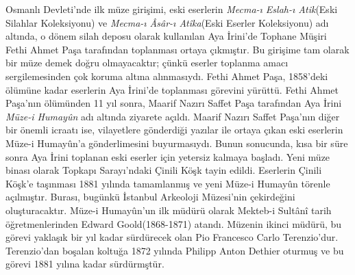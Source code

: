 \indent Osmanlı Devleti'nde ilk müze girişimi, eski eserlerin \textit{Mecma-ı Eslah-ı Atik}(Eski Silahlar Koleksiyonu) ve \textit{Mecma-ı Âsâr-ı Atîka}(Eski Eserler Koleksiyonu) adı altında, o dönem silah deposu olarak kullanılan  Aya İrini'de  Tophane Müşiri Fethi Ahmet Paşa tarafından toplanması ortaya çıkmıştır.\cite{degirmenci} Bu girişime tam olarak bir müze demek doğru olmayacaktır; çünkü eserler toplanma amacı sergilemesinden çok koruma altına alınmasıydı. Fethi Ahmet Paşa, 1858'deki ölümüne kadar eserlerin Aya İrini'de toplanması görevini yürüttü. Fethi Ahmet Paşa'nın ölümünden 11 yıl sonra, Maarif Nazırı Saffet Paşa tarafından Aya İrini \textit{Müze-i Humay\^{u}n} adı altında ziyarete açıldı. Maarif Nazırı Saffet Paşa'nın diğer bir önemli icraatı ise, vilayetlere gönderdiği yazılar ile ortaya çıkan eski eserlerin Müze-i Humay\^{u}n'a gönderlimesini buyurmasıydı. Bunun sonucunda, kısa bir süre sonra Aya İrini toplanan eski eserler için yetersiz kalmaya başladı. Yeni müze binası olarak Topkapı Sarayı'ndaki Çinili Köşk tayin edildi. Eserlerin Çinili Köşk'e taşınması 1881 yılında tamamlanmış ve yeni Müze-i Humay\^{u}n törenle açılmıştır. Burası, bugünkü İstanbul Arkeoloji Müzesi'nin çekirdeğini oluşturacaktır.
\indent Müze-i Humayûn'un ilk müdürü olarak Mekteb-i Sultânî tarih öğretmenlerinden  Edward Goold(1868-1871) atandı. Müzenin ikinci müdürü, bu görevi yaklaşık bir yıl kadar sürdürecek olan Pio Francesco Carlo Terenzio'dur. Terenzio'dan boşalan koltuğa 1872 yılında Philipp Anton Dethier oturmuş ve bu görevi 1881 yılına kadar sürdürmştür.\cite{saatci}